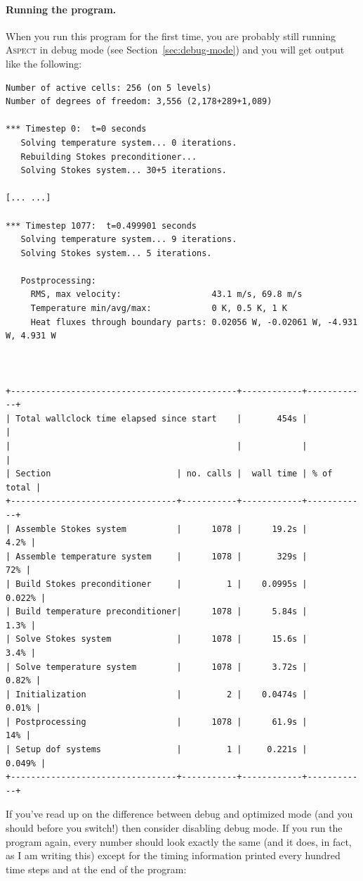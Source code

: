\documentclass{article}
\newcommand{\aspect}{\textsc{Aspect}}
\begin{document}
\paragraph{Running the program.}
When you run this program for the first time, you are probably still running
\aspect{} in debug mode (see Section~\ref{sec:debug-mode}) and you will get
output like the following:

\begin{lstlisting}[frame=single,language=ksh]
Number of active cells: 256 (on 5 levels)
Number of degrees of freedom: 3,556 (2,178+289+1,089)

*** Timestep 0:  t=0 seconds
   Solving temperature system... 0 iterations.
   Rebuilding Stokes preconditioner...
   Solving Stokes system... 30+5 iterations.

[... ...]

*** Timestep 1077:  t=0.499901 seconds
   Solving temperature system... 9 iterations.
   Solving Stokes system... 5 iterations.

   Postprocessing:
     RMS, max velocity:                  43.1 m/s, 69.8 m/s
     Temperature min/avg/max:            0 K, 0.5 K, 1 K
     Heat fluxes through boundary parts: 0.02056 W, -0.02061 W, -4.931 W, 4.931 W



+---------------------------------------------+------------+------------+
| Total wallclock time elapsed since start    |       454s |            |
|                                             |            |            |
| Section                         | no. calls |  wall time | % of total |
+---------------------------------+-----------+------------+------------+
| Assemble Stokes system          |      1078 |      19.2s |       4.2% |
| Assemble temperature system     |      1078 |       329s |        72% |
| Build Stokes preconditioner     |         1 |    0.0995s |     0.022% |
| Build temperature preconditioner|      1078 |      5.84s |       1.3% |
| Solve Stokes system             |      1078 |      15.6s |       3.4% |
| Solve temperature system        |      1078 |      3.72s |      0.82% |
| Initialization                  |         2 |    0.0474s |      0.01% |
| Postprocessing                  |      1078 |      61.9s |        14% |
| Setup dof systems               |         1 |     0.221s |     0.049% |
+---------------------------------+-----------+------------+------------+
\end{lstlisting}

If you've read up on the difference between debug and optimized mode (and you
should before you switch!) then consider disabling debug mode. If you run the
program again, every number should look exactly the same (and it does, in fact,
as I am writing this) except for the timing information printed every hundred
time steps and at the end of the program:
\end{document}
